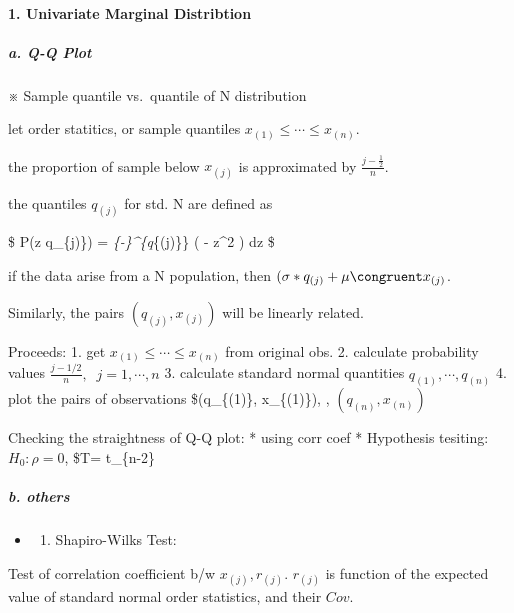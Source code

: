 \documentclass[
]{book}
\providecommand{\tightlist}{%
  \setlength{\itemsep}{0pt}\setlength{\parskip}{0pt}}
\begin{document}
{{{\hypertarget{univariate-marginal-distribtion}{%
\paragraph{1. Univariate Marginal Distribtion}\label{univariate-marginal-distribtion}}

\hypertarget{a.-q-q-plot}{%
\subparagraph{a. Q-Q Plot}\label{a.-q-q-plot}}

※ Sample quantile vs.~quantile of N distribution

let order statitics, or sample quantiles \(x_{(1)} \le \cdots \le x_{(n)}\).

the proportion of sample below \(x_{(j)}\) is approximated by \(\tfrac{j-\tfrac{1}{2}}{n}\).

the quantiles \(q_{(j)}\) for std. N are defined as

\$
P(z \le q\_\{j)\}) = \int\emph{\{-\infty\}\^{}\{q}\{(j)\}\}  \exp \left( - z\^{}2 \right) dz \overset {\triangle}{=} 
\$

if the data arise from a N population, then \((\sigma \ast q_{(j)} + \mu \congruent x_{(j)}\).

Similarly, the pairs \((q_{(j)}, x_{(j)})\) will be linearly related.

Proceeds:
1. get \(x_{(1)} \le \cdots \le x_{(n)}\) from original obs.
2. calculate probability values \(\tfrac{j-1/2}{n}, \; \; j= 1, \cdots, n\)
3. calculate standard normal quantities \(q_{(1)}, \cdots, q_{(n)}\)
4. plot the pairs of observations \$(q\_\{(1)\}, x\_\{(1)\}), \cdots, \((q_{(n)}, x_{(n)})\)

Checking the straightness of Q-Q plot:
* using corr coef
* Hypothesis tesiting: \(H_0: \rho=0\), \$T=  t\_\{n-2\}

\hypertarget{b.-others}{%
\subparagraph{b. others}\label{b.-others}}

\begin{itemize}
\item
  \begin{enumerate}
  \def\labelenumi{\arabic{enumi}.}
  \tightlist
  \item
    Shapiro-Wilks Test:
  \end{enumerate}
\end{itemize}

Test of correlation coefficient b/w \(x_{(j)}, r_{(j)}\). \(r_{(j)}\) is function of the expected value of standard normal order statistics, and their \(Cov\).

}}}
\end{document}

